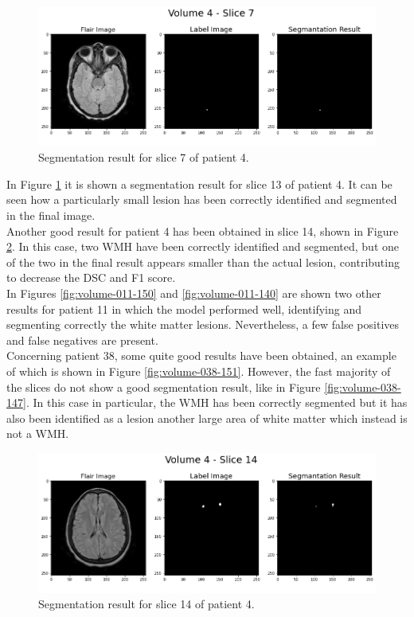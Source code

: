 \documentclass[12pt]{extarticle}
\begin{document}
\begin{figure}[h!]
\centering
\includegraphics[width = \textwidth]{volume-004-007.png}
\caption{Segmentation result for slice 7 of patient 4.}
\label{fig:volume-004-007}
\end{figure}
\vspace{6pt}
\noindent In Figure \ref{fig:volume-004-007} it is shown a segmentation result for slice 13 of patient 4. It can be seen how a particularly small lesion has been correctly identified and segmented in the final image.\\[4pt]
Another good result for patient 4 has been obtained in slice 14, shown in Figure \ref{fig:volume-004-014}. In this case, two WMH have been correctly identified and segmented, but one of the two in the final result appears smaller than the actual lesion, contributing to decrease the DSC and F1 score.\\[4pt]
In Figures \ref{fig:volume-011-150} and \ref{fig:volume-011-140} are shown two other results for patient 11 in which the model performed well, identifying and segmenting correctly the white matter lesions. Nevertheless, a few false positives and false negatives are present.\\[4pt]
Concerning patient 38, some quite good results have been obtained, an example of which is shown in Figure \ref{fig:volume-038-151}. However, the fast majority of the slices do not show a good segmentation result, like in Figure \ref{fig:volume-038-147}. In this case in particular, the WMH has been correctly segmented but it has also been identified as a lesion another large area of white matter which instead is not a WMH.


\begin{figure}[h!]
\centering
\includegraphics[width = \textwidth]{volume-004-014.png}
\caption{Segmentation result for slice 14 of patient 4.}
\label{fig:volume-004-014}
\end{figure}
\end{document}
